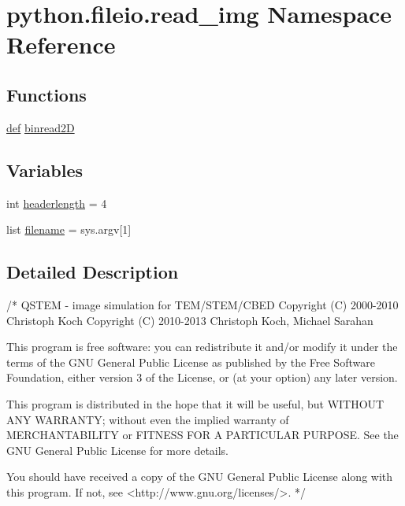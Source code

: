\hypertarget{namespacepython_1_1fileio_1_1read__img}{\section{python.\-fileio.\-read\-\_\-img Namespace Reference}
\label{namespacepython_1_1fileio_1_1read__img}
}
\subsection*{Functions}
\begin{DoxyCompactItemize}
\item 
\hyperlink{sim_image_from_wave_8m_a72b6b8e83430abf007f20aeae4dc2f74}{def} \hyperlink{namespacepython_1_1fileio_1_1read__img_a3ffec208a1fe92342eafab85c08961a0}{binread2\-D}
\end{DoxyCompactItemize}
\subsection*{Variables}
\begin{DoxyCompactItemize}
\item 
int \hyperlink{namespacepython_1_1fileio_1_1read__img_abcc43c5b7904c6f21fbf4ff8898911b0}{headerlength} = 4
\item 
list \hyperlink{namespacepython_1_1fileio_1_1read__img_a36fc09d1528b241c1c750e4c11e77e5a}{filename} = sys.\-argv\mbox{[}1\mbox{]}
\end{DoxyCompactItemize}


\subsection{Detailed Description}
\begin{DoxyVerb}/*
QSTEM - image simulation for TEM/STEM/CBED
    Copyright (C) 2000-2010  Christoph Koch
    Copyright (C) 2010-2013  Christoph Koch, Michael Sarahan

    This program is free software: you can redistribute it and/or modify
    it under the terms of the GNU General Public License as published by
    the Free Software Foundation, either version 3 of the License, or
    (at your option) any later version.

    This program is distributed in the hope that it will be useful,
    but WITHOUT ANY WARRANTY; without even the implied warranty of
    MERCHANTABILITY or FITNESS FOR A PARTICULAR PURPOSE.  See the
    GNU General Public License for more details.

    You should have received a copy of the GNU General Public License
    along with this program.  If not, see <http://www.gnu.org/licenses/>.
*/
\end{DoxyVerb}
 

